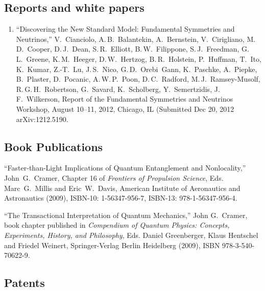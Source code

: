 \newpage
\let\thefootnote\relax{}
\let\thefootnote\relax{}

%
%
%
\subsection{Reports and white papers}
%
%
%

\begin{enumerate} %

\item ``Discovering the New Standard Model: Fundamental Symmetries and Neutrinos,''
V.~Cianciolo, A.\,B.~Balantekin, A.~Bernstein, V.~Cirigliano, M.\,D.~Cooper, D.\,J.~Dean, S.\,R.~Elliott, B.\,W.~Filippone, S.\,J.~Freedman, G.\,L.~Greene, K.\,M.~Heeger, D.\,W.~Hertzog\leadauthor, B.\,R.~Holstein, P.~Huffman, T.~Ito, K.~Kumar, Z.-T.~Lu, J.\,S.~Nico, G.\,D.~Orebi~Gann, K.~Paschke, A.~Piepke, B.~Plaster, D.~Pocanic, A.\,W.\,P.~Poon, D.\,C.~Radford, M.\,J.~Ramsey-Musolf, R.\,G.\,H.~Robertson\leadauthor, G.~Savard, K.~Scholberg, Y.~Semertzidis, J.\,F.~Wilkerson, Report of the Fundamental Symmetries and Neutrinos Workshop, August 10--11, 2012, Chicago, IL (Submitted Dec 20, 2012 arXiv:1212.5190.

\end{enumerate} %

%
%
%
\subsection{Book Publications}
%
%
%

``Faster-than-Light Implications of Quantum Entanglement and Nonlocality,'' John~G.~Cramer, Chapter 16 of \emph{Frontiers of Propulsion Science}, Eds. Marc~G.~Millis and Eric~W.~Davis, American Institute of Aeronautics and Astronautics
(2009), ISBN-10: 1-56347-956-7, ISBN-13: 978-1-56347-956-4.

``The Transactional Interpretation of Quantum Mechanics,'' John G.~Cramer, book
chapter published in \emph{Compendium of Quantum Physics: Concepts, Experiments,
History, and Philosophy}, Eds. Daniel Greenberger, Klaus Hentschel and Friedel
Weinert, Springer-Verlag Berlin Heidelberg (2009), ISBN 978-3-540-70622-9.

%
%
%
\subsection{Patents}
%
%
%

